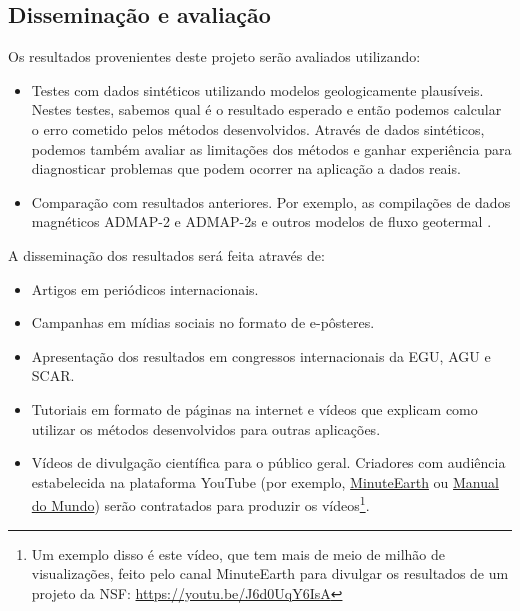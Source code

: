 \documentclass[11pt,a4paper,oneside]{book}
\begin{document}
\subsection{Disseminação e avaliação}

Os resultados provenientes deste projeto serão avaliados utilizando:

\begin{itemize}
  \item Testes com dados sintéticos utilizando modelos geologicamente
    plausíveis. Nestes testes, sabemos qual é o resultado esperado e então
    podemos calcular o erro cometido pelos métodos desenvolvidos. Através de
    dados sintéticos, podemos também avaliar as limitações dos métodos e ganhar
    experiência para diagnosticar problemas que podem ocorrer na aplicação a
    dados reais.
  \item Comparação com resultados anteriores. Por exemplo, as compilações de
    dados magnéticos ADMAP-2 e ADMAP-2s \citep{Golynsky2018, Kim2022} e outros
    modelos de fluxo geotermal \citep{FoxMaule2005, Losing2021, Losing2020,
    Stal2021}.
\end{itemize}

\noindent
A disseminação dos resultados será feita através de:

\begin{itemize}
  \item Artigos em periódicos internacionais.
  \item Campanhas em mídias sociais no formato de e-pôsteres.
  \item Apresentação dos resultados em congressos internacionais da EGU, AGU e
    SCAR.
  \item Tutoriais em formato de páginas na internet e vídeos que explicam como
    utilizar os métodos desenvolvidos para outras aplicações.
  \item Vídeos de divulgação científica para o público geral. Criadores com
    audiência estabelecida na plataforma YouTube (por exemplo,
    \href{https://www.youtube.com/@MinuteEarth}{MinuteEarth} ou
    \href{https://www.youtube.com/@manualdomundo}{Manual do Mundo})
    serão contratados para produzir os vídeos\footnote{Um exemplo disso é este
    vídeo, que tem mais de meio de milhão de visualizações, feito pelo canal
    MinuteEarth para divulgar os resultados de um projeto da NSF:
    \url{https://youtu.be/J6d0UqY6IsA}}.
\end{itemize}
\end{document}
